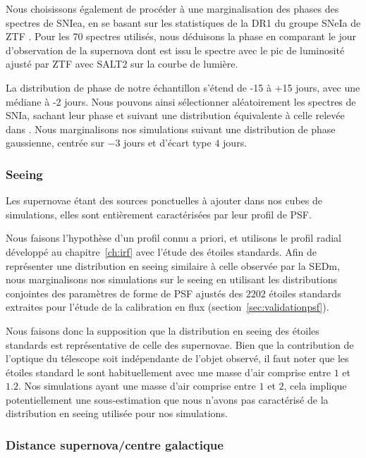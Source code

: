 \documentclass[../main/main.tex]{subfiles}
\begin{document}
Nous choisissons également de 
procéder à une marginalisation des phases des spectres de SNIea, en se
basant sur les statistiques de la
DR1 du groupe SNeIa de ZTF \citep{DhawanZTFDR1}. Pour
les 70 spectres utilisés, nous déduisons la phase en comparant le
jour d'observation de la supernova dont est issu le spectre avec le pic
de luminosité ajusté par ZTF avec SALT2
\citep{Guysalt2005,Guysalt22007,Guy2010,Betoule2014} sur la courbe de
lumière.

La distribution de phase de notre échantillon s'étend de -15 à
+15 jours, avec une médiane à -2 jours. Nous pouvons ainsi sélectionner
aléatoirement les spectres de SNIa, sachant leur phase et suivant une
distribution équivalente à celle relevée dans \citep{DhawanZTFDR1}. Nous marginalisons nos simulations suivant
une distribution de phase gaussienne, centrée sur $-3$ jours et d'écart
type $4$ jours.

\subsubsection{Seeing}

Les supernovae étant des sources ponctuelles à ajouter dans nos cubes
de simulations, elles sont entièrement caractérisées par leur profil de
PSF.

Nous faisons l'hypothèse d'un profil connu a priori, et
utilisons le profil radial développé au chapitre~\ref{ch:irf} avec
l'étude des étoiles standards. Afin de représenter une distribution en
seeing similaire à celle observée par la SEDm, nous marginalisons nos
simulations sur le seeing en utilisant les
distributions conjointes des paramètres de forme de PSF ajustés des $2202$
étoiles standards extraites pour l'étude de la calibration en
flux (section~\ref{sec:validationpsf}).

Nous faisons donc la supposition que la distribution en seeing des
étoiles standards est représentative de celle des supernovae. Bien que
la contribution de l'optique du télescope soit indépendante
de l'objet observé, il faut noter que les étoiles standard le sont
habituellement avec une masse d'air comprise entre $1$ et
$1.2$. Nos simulations ayant une masse d'air comprise entre $1$ et $2$, cela implique potentiellement une sous-estimation que nous
n'avons pas caractérisé de la
distribution en seeing utilisée pour nos simulations.

\subsubsection{Distance supernova/centre galactique}\label{ssec:distancesimu}
\end{document}
